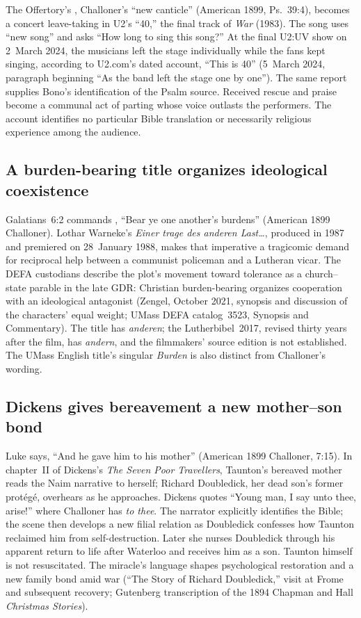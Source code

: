The Offertory's , Challoner's ``new canticle''
(American 1899, Ps.~39:4), becomes a concert leave-taking in U2's ``40,''
the final track of \emph{War} (1983). The song uses ``new song'' and
asks ``How long to sing this song?'' At the final U2:UV show on
2~March 2024, the musicians left the stage individually while the fans
kept singing, according to U2.com's dated account, ``This is 40''
(5~March 2024, paragraph beginning ``As the band left the stage one by
one''). The same report supplies Bono's identification of the Psalm
source. Received rescue and praise become a communal act of parting whose
voice outlasts the performers. The account identifies no particular Bible
translation or necessarily religious experience among the audience.

\subsection*{A burden-bearing title organizes ideological coexistence\enspace{}}

Galatians~6:2 commands ,
``Bear ye one another's burdens'' (American 1899 Challoner).
Lothar Warneke's \emph{Einer trage des anderen Last\ldots}, produced
in 1987 and premiered on 28~January 1988, makes that imperative a
tragicomic demand for reciprocal help between a communist policeman and a
Lutheran vicar. The DEFA custodians describe the plot's movement toward
tolerance as a church--state parable in the late GDR: Christian
burden-bearing organizes cooperation with an ideological antagonist
(Zengel, October 2021, synopsis and discussion of the characters' equal
weight; UMass DEFA catalog~3523, Synopsis and Commentary).
The title has \emph{anderen}; the Lutherbibel~2017, revised thirty years
after the film, has \emph{andern}, and the filmmakers' source edition is
not established. The UMass English title's
singular \emph{Burden} is also distinct from Challoner's wording.

\subsection*{Dickens gives bereavement a new mother--son bond\enspace{}}

Luke says, ``And he gave him to his mother'' (American 1899 Challoner,
7:15). In chapter~II of Dickens's \emph{The Seven Poor Travellers},
Taunton's bereaved mother reads the Naim narrative to herself; Richard
Doubledick, her dead son's former protégé, overhears as he approaches.
Dickens quotes ``Young man, I say unto
thee, arise!'' where Challoner has \emph{to thee}. The narrator explicitly
identifies the Bible; the scene then develops a new filial relation as
Doubledick confesses how Taunton reclaimed him from self-destruction.
Later she nurses Doubledick through his apparent return to life after
Waterloo and receives him as a son. Taunton himself is not resuscitated.
The miracle's language shapes psychological restoration and a new family
bond amid war (``The Story of Richard Doubledick,'' visit at Frome and
subsequent recovery; Gutenberg transcription of the 1894 Chapman and Hall
\emph{Christmas Stories}).
